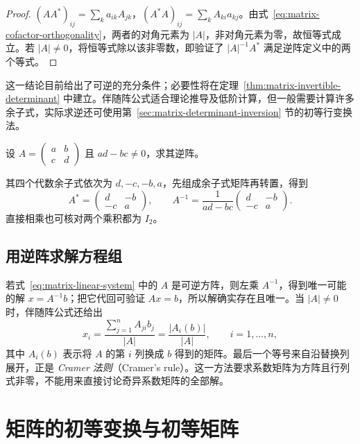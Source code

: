 \begin{proof}
$(AA^*)_{ij}=\sum_k a_{ik}A_{jk}$，$(A^*A)_{ij}=\sum_k A_{ki}a_{kj}$。由式~\eqref{eq:matrix-cofactor-orthogonality}，两者的对角元素为 $|A|$，非对角元素为零，故恒等式成立。若 $|A|\ne0$，将恒等式除以该非零数，即验证了 $|A|^{-1}A^*$ 满足逆阵定义中的两个等式。
\end{proof}

这一结论目前给出了可逆的充分条件；必要性将在定理~\ref{thm:matrix-invertible-determinant} 中建立。伴随阵公式适合理论推导及低阶计算，但一般需要计算许多余子式，实际求逆还可使用第~\ref{sec:matrix-determinant-inversion} 节的初等行变换法。

\begin{example}
\label{ex:matrix-two-by-two-inverse}
设 $A=\begin{pmatrix}a&b\\c&d\end{pmatrix}$ 且 $ad-bc\ne0$，求其逆阵。
\end{example}

\begin{solve}
其四个代数余子式依次为 $d,-c,-b,a$，先组成余子式矩阵再转置，得到
\[
    A^*=\begin{pmatrix}d&-b\\-c&a\end{pmatrix},\qquad
    A^{-1}=\frac1{ad-bc}\begin{pmatrix}d&-b\\-c&a\end{pmatrix}.
\]
直接相乘也可核对两个乘积都为 $I_2$。
\end{solve}

\subsection{用逆阵求解方程组}

若式~\eqref{eq:matrix-linear-system} 中的 $A$ 是可逆方阵，则左乘 $A^{-1}$，得到唯一可能的解 $x=A^{-1}b$；把它代回可验证 $Ax=b$，所以解确实存在且唯一。当 $|A|\ne0$ 时，伴随阵公式还给出
\[
    x_i=\frac{\sum_{j=1}^{n}A_{ji}b_j}{|A|}
        =\frac{|A_i(b)|}{|A|},\qquad i=1,\ldots,n,
\]
其中 $A_i(b)$ 表示将 $A$ 的第 $i$ 列换成 $b$ 得到的矩阵。最后一个等号来自沿替换列展开，正是 \emph{Cramer 法则}（Cramer's rule）。这一方法要求系数矩阵为方阵且行列式非零，不能用来直接讨论奇异系数矩阵的全部解。

\section{矩阵的初等变换与初等矩阵}
\label{sec:matrix-elementary-transformations}

